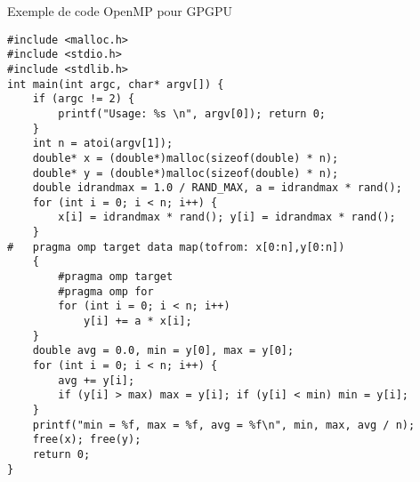 \documentclass[handout,francais]{beamer}
\begin{document}
\begin{frame}[fragile]{Exemple de code OpenMP pour GPGPU}
\begin{lstlisting}
#include <malloc.h>
#include <stdio.h>
#include <stdlib.h>
int main(int argc, char* argv[]) {
    if (argc != 2) {
        printf("Usage: %s \n", argv[0]); return 0;
    }     
    int n = atoi(argv[1]);     
    double* x = (double*)malloc(sizeof(double) * n);
    double* y = (double*)malloc(sizeof(double) * n); 
    double idrandmax = 1.0 / RAND_MAX, a = idrandmax * rand();
    for (int i = 0; i < n; i++) {
        x[i] = idrandmax * rand(); y[i] = idrandmax * rand();
    }
#   pragma omp target data map(tofrom: x[0:n],y[0:n])
    {
        #pragma omp target
        #pragma omp for
        for (int i = 0; i < n; i++)
            y[i] += a * x[i];
    }
    double avg = 0.0, min = y[0], max = y[0];
    for (int i = 0; i < n; i++) {
        avg += y[i];
        if (y[i] > max) max = y[i]; if (y[i] < min) min = y[i];
    }
    printf("min = %f, max = %f, avg = %f\n", min, max, avg / n);     
    free(x); free(y);
    return 0;
}
\end{lstlisting}
\end{frame}
\end{document}
